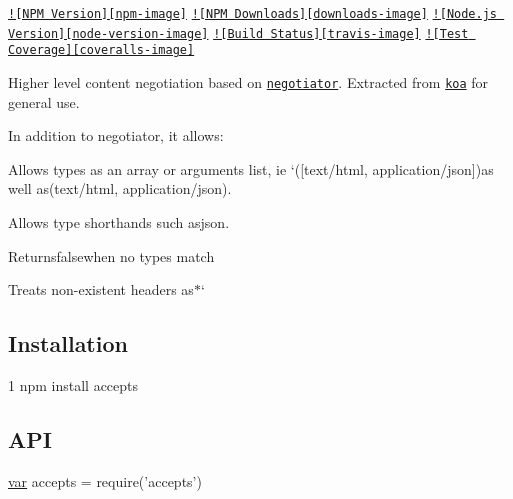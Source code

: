 \href{https://npmjs.org/package/accepts}{\tt !\mbox{[}N\+P\+M Version\mbox{]}\mbox{[}npm-\/image\mbox{]}} \href{https://npmjs.org/package/accepts}{\tt !\mbox{[}N\+P\+M Downloads\mbox{]}\mbox{[}downloads-\/image\mbox{]}} \href{http://nodejs.org/download/}{\tt !\mbox{[}Node.\+js Version\mbox{]}\mbox{[}node-\/version-\/image\mbox{]}} \href{https://travis-ci.org/jshttp/accepts}{\tt !\mbox{[}Build Status\mbox{]}\mbox{[}travis-\/image\mbox{]}} \href{https://coveralls.io/r/jshttp/accepts}{\tt !\mbox{[}Test Coverage\mbox{]}\mbox{[}coveralls-\/image\mbox{]}}

Higher level content negotiation based on \href{https://www.npmjs.com/package/negotiator}{\tt negotiator}. Extracted from \href{https://www.npmjs.com/package/koa}{\tt koa} for general use.

In addition to negotiator, it allows\+:


\begin{DoxyItemize}
\item Allows types as an array or arguments list, ie `(\mbox{[}\textquotesingle{}text/html\textquotesingle{}, \textquotesingle{}application/json\textquotesingle{}\mbox{]}){\ttfamily as well as}(\textquotesingle{}text/html\textquotesingle{}, \textquotesingle{}application/json\textquotesingle{}){\ttfamily .}
\item {\ttfamily Allows type shorthands such as}json{\ttfamily .}
\item {\ttfamily Returns}false{\ttfamily when no types match}
\item {\ttfamily Treats non-\/existent headers as}$\ast$`
\end{DoxyItemize}

\subsection*{Installation}


\begin{DoxyCode}
1 npm install accepts
\end{DoxyCode}


\subsection*{A\+P\+I}


\begin{DoxyCode}
\hyperlink{018__def_8c_a335628f2e9085305224b4f9cc6e95ed5}{var} accepts = require(\textcolor{stringliteral}{'accepts'})
\end{DoxyCode}


